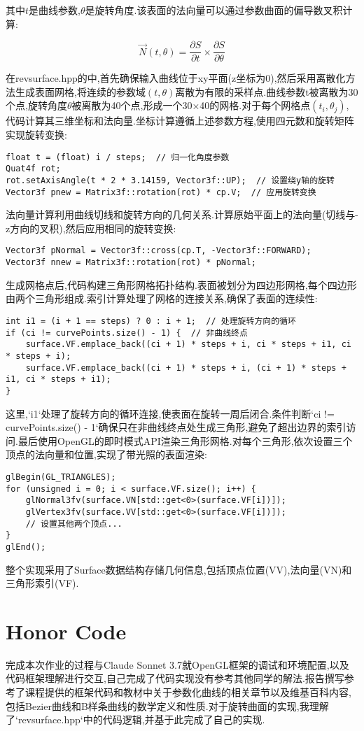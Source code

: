 \documentclass[a4paper,twoside]{article}
\begin{document}
其中$t$是曲线参数,$\theta$是旋转角度.该表面的法向量可以通过参数曲面的偏导数叉积计算:

\begin{equation}
\vec{N}(t, \theta) = \frac{\partial S}{\partial t} \times \frac{\partial S}{\partial \theta}
\end{equation}

在revsurface.hpp的中,首先确保输入曲线位于xy平面(z坐标为0),然后采用离散化方法生成表面网格,将连续的参数域$(t, \theta)$离散为有限的采样点.曲线参数t被离散为30个点,旋转角度$\theta$被离散为40个点,形成一个30×40的网格.对于每个网格点$(t_i, \theta_j)$,代码计算其三维坐标和法向量.坐标计算遵循上述参数方程,使用四元数和旋转矩阵实现旋转变换:

\begin{verbatim}
float t = (float) i / steps;  // 归一化角度参数
Quat4f rot;
rot.setAxisAngle(t * 2 * 3.14159, Vector3f::UP);  // 设置绕y轴的旋转
Vector3f pnew = Matrix3f::rotation(rot) * cp.V;  // 应用旋转变换
\end{verbatim}

法向量计算利用曲线切线和旋转方向的几何关系.计算原始平面上的法向量(切线与-z方向的叉积),然后应用相同的旋转变换:

\begin{verbatim}
Vector3f pNormal = Vector3f::cross(cp.T, -Vector3f::FORWARD);
Vector3f nnew = Matrix3f::rotation(rot) * pNormal;
\end{verbatim}

生成网格点后,代码构建三角形网格拓扑结构.表面被划分为四边形网格,每个四边形由两个三角形组成.索引计算处理了网格的连接关系,确保了表面的连续性:

\begin{verbatim}
int i1 = (i + 1 == steps) ? 0 : i + 1;  // 处理旋转方向的循环
if (ci != curvePoints.size() - 1) {  // 非曲线终点
    surface.VF.emplace_back((ci + 1) * steps + i, ci * steps + i1, ci * steps + i);
    surface.VF.emplace_back((ci + 1) * steps + i, (ci + 1) * steps + i1, ci * steps + i1);
}
\end{verbatim}

这里,`i1`处理了旋转方向的循环连接,使表面在旋转一周后闭合.条件判断`ci != curvePoints.size() - 1`确保只在非曲线终点处生成三角形,避免了超出边界的索引访问.最后使用OpenGL的即时模式API渲染三角形网格.对每个三角形,依次设置三个顶点的法向量和位置,实现了带光照的表面渲染:

\begin{verbatim}
glBegin(GL_TRIANGLES);
for (unsigned i = 0; i < surface.VF.size(); i++) {
    glNormal3fv(surface.VN[std::get<0>(surface.VF[i])]);
    glVertex3fv(surface.VV[std::get<0>(surface.VF[i])]);
    // 设置其他两个顶点...
}
glEnd();
\end{verbatim}

整个实现采用了Surface数据结构存储几何信息,包括顶点位置(VV),法向量(VN)和三角形索引(VF).

\section{Honor Code}
完成本次作业的过程与Claude Sonnet 3.7就OpenGL框架的调试和环境配置,以及代码框架理解进行交互,自己完成了代码实现没有参考其他同学的解法.报告撰写参考了课程提供的框架代码和教材中关于参数化曲线的相关章节以及维基百科内容,包括Bezier曲线和B样条曲线的数学定义和性质.对于旋转曲面的实现,我理解了`revsurface.hpp`中的代码逻辑,并基于此完成了自己的实现.
\end{document}
